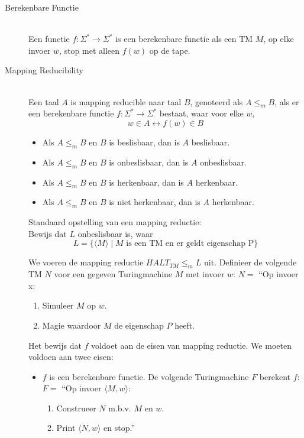 \documentclass[]{article}
\begin{document}
\begin{itemize}
\begin{description}
	\item[Berekenbare Functie] \hfill \\
	Een functie $f: \Sigma^* \rightarrow \Sigma^*$ is een berekenbare functie als een TM $M$, op elke invoer $w$, stop met alleen $f(w)$ op de tape.
	
	\item[Mapping Reducibility] \hfill \\
	Een taal $A$ is mapping reducible naar taal $B$, genoteerd als $A \leq_m B$, als er een berekenbare functie $f: \Sigma^* \rightarrow \Sigma^*$ bestaat, waar voor elke $w$,
	$$w \in A \longleftrightarrow f(w) \in B$$
	\begin{itemize}
		\item Als $A \leq_m B$ en $B$ is beslisbaar, dan is $A$ beslisbaar.
		\item Als $A \leq_m B$ en $B$ is onbeslisbaar, dan is $A$ onbeslisbaar.
		\item Als $A \leq_m B$ en $B$ is herkenbaar, dan is $A$ herkenbaar.
		\item Als $A \leq_m B$ en $B$ is niet herkenbaar, dan is $A$ herkenbaar.
	\end{itemize}
	
	Standaard opstelling van een mapping reductie:\\
	Bewijs dat $L$ onbeslisbaar is, waar
	$$L = \{ \langle M \rangle \mid M \mbox{ is een TM en er geldt eigenschap P}\}$$ 

	We voeren de mapping reductie $HALT_{TM} \leq_m L$ uit.
	Definieer de volgende TM $N$ voor een gegeven Turingmachine $M$ met invoer $w$:
	$N = $ ``Op invoer x:
	\begin{enumerate}
		\item Simuleer $M$ op $w$.
		\item Magie waardoor $M$ de eigenschap $P$ heeft.
	\end{enumerate}
	
	Het bewijs dat $f$ voldoet aan de eisen van mapping reductie. We moeten voldoen aan twee eisen:
	\begin{itemize}
		\item $f$ is een berekenbare functie. De volgende Turingmachine $F$ berekent $f$: \\
		$F = $ ``Op invoer $\langle M, w \rangle$:
		\begin{enumerate}
			\item Construeer $N$ m.b.v. $M$ en $w$.
			\item Print $\langle N, w \rangle$ en stop.''
		\end{enumerate}
		

\end{itemize}
\end{description}
\end{itemize}
\end{document}
